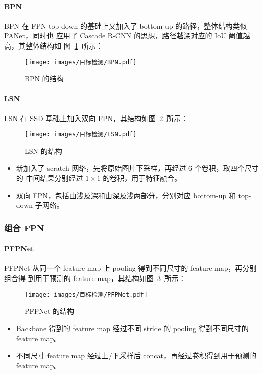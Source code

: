 \paragraph{BPN}
BPN 在 FPN top-down 的基础上又加入了 bottom-up 的路径，整体结构类似 PANet，同时也
应用了 Cascade R-CNN 的思想，路径越深对应的 IoU 阈值越高，其整体结构如
图~\ref{fig:BPN}~所示：

\begin{figure}[ht]
  \centering
  \texttt{[image: images/目标检测/BPN.pdf]}
  \caption{BPN 的结构}\label{fig:BPN}
\end{figure}

\paragraph{LSN}
LSN 在 SSD 基础上加入双向 FPN，其结构如图~\ref{fig:LSN}~所示：

\begin{figure}[ht]
  \centering
  \texttt{[image: images/目标检测/LSN.pdf]}
  \caption{LSN 的结构}\label{fig:LSN}
\end{figure}

\begin{itemize}
  \item 新加入了 scratch 网络，先将原始图片下采样，再经过 6 个卷积，取四个尺寸的
    中间结果分别经过 $1 \times 1$ 的卷积，用于特征融合。
  \item 双向 FPN，包括由浅及深和由深及浅两部分，分别对应 bottom-up 和 top-down
    子网络。
\end{itemize}

\subsubsection{组合 FPN}
\paragraph{PFPNet}
PFPNet 从同一个 feature map 上 pooling 得到不同尺寸的 feature map，再分别组合得
到用于预测的 feature map，其结构如图~\ref{fig:PFPNet}~所示：

\begin{figure}[ht]
  \centering
  \texttt{[image: images/目标检测/PFPNet.pdf]}
  \caption{PFPNet 的结构}\label{fig:PFPNet}
\end{figure}

\begin{itemize}
\item Backbone 得到的 feature map 经过不同 stride 的 pooling 得到不同尺寸的
  feature map。 
\item 不同尺寸 feature map 经过上/下采样后 concat，再经过卷积得到用于预测的
  feature map。
\end{itemize}


